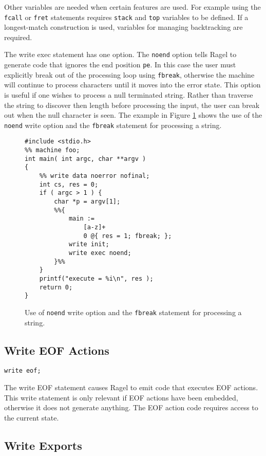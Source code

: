 \documentclass[letterpaper,11pt,oneside]{book}
\newcommand{\verbspace}{\vspace{10pt}}
\begin{document}
Other variables are needed when certain features are used. For example using
the \verb|fcall| or \verb|fret| statements requires \verb|stack| and
\verb|top| variables to be defined. If a longest-match construction is used,
variables for managing backtracking are required.

The write exec statement has one option. The \verb|noend| option tells Ragel
to generate code that ignores the end position \verb|pe|. In this
case the user must explicitly break out of the processing loop using
\verb|fbreak|, otherwise the machine will continue to process characters until
it moves into the error state. This option is useful if one wishes to process a
null terminated string. Rather than traverse the string to discover then length
before processing the input, the user can break out when the null character is
seen.  The example in Figure \ref{fbreak-example} shows the use of the
\verb|noend| write option and the \verb|fbreak| statement for processing a string.

\begin{figure}
\small
\begin{verbatim}
#include <stdio.h>
%% machine foo;
int main( int argc, char **argv )
{
    %% write data noerror nofinal;
    int cs, res = 0;
    if ( argc > 1 ) {
        char *p = argv[1];
        %%{ 
            main := 
                [a-z]+ 
                0 @{ res = 1; fbreak; };
            write init;
            write exec noend;
        }%%
    }
    printf("execute = %i\n", res );
    return 0;
}
\end{verbatim}
\caption{Use of {\tt noend} write option and the {\tt fbreak} statement for
processing a string.}
\label{fbreak-example}
\end{figure}


\subsection{Write EOF Actions}
\begin{verbatim}
write eof;
\end{verbatim}
\verbspace

The write EOF statement causes Ragel to emit code that executes EOF actions.
This write statement is only relevant if EOF actions have been embedded,
otherwise it does not generate anything. The EOF action code requires access to
the current state.

\subsection{Write Exports}
\label{export}
\end{document}

